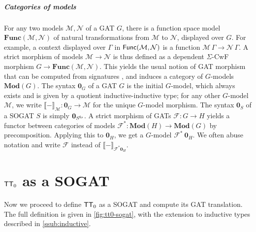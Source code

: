 \documentclass[10pt,a4paper]{article}
\theoremstyle{definition}
\theoremstyle{remark}
\newcommand{\s}[1]{{\ensuremath{\textsf{\upshape #1}}}\xspace}
\newcommand{\cl}[1]{{\ensuremath{\mathcal{#1}}}\xspace}
\newcommand{\re}[1]{{\ensuremath{\mathbf{#1}}}\xspace}
\newcommand{\ZTT}{\ensuremath{\s{TT}_0}\xspace}
\begin{document}
\subparagraph{Categories of models}

For any two models $\cl M, \cl N$ of a GAT $G$, there is a function space model
$\re{Func}(\cl M, \cl N)$ of natural transformations from $\cl M$ to $\cl N$,
displayed over $G$. For example, a context displayed over $\Gamma$ in
$\s{Func}(\cl M, \cl N)$ is a function $\cl M\, \Gamma \to \cl N\, \Gamma$. A
strict morphism of models $\cl M \to \cl N$ is thus defined as a dependent
$\Sigma$-CwF morphism $G \to \re{Func}(\cl M, \cl N)$. This yields the usual
notion of GAT morphism that can be computed from signatures
\cite{Kovacs2023-gq}, and induces a category of $G$-models $\re{Mod}(G)$. The
syntax $\re 0_G$ of a GAT $G$ is the initial $G$-model, which always exists and
is given by a quotient inductive-inductive type; for any other $G$-model $\cl
M$, we write $\llbracket-\rrbracket_{\cl M} : \re 0_G \to \cl M$ for the unique
$G$-model morphism. The syntax $\re 0_S$ of a SOGAT $S$ is simply $\re 0_{S^{\s
fo}}$. A strict morphism\label{rem:morphisms} of GATs $\cl F : G \to H$ yields a
functor between categories of models $\cl F^* : \re{Mod}(H) \to \re{Mod}(G)$ by
precomposition. Applying this to $\re 0_H$, we get a
$G$-model $\cl F^*\ \re 0_H$. We often abuse notation and write $\cl F$ instead of $\llbracket - \rrbracket_{\cl F^* \re 0_H}$.

\section{\ZTT as a SOGAT}\label{sec:itt-sogat}

Now we proceed to define \ZTT as a SOGAT and compute its GAT translation. The
full definition is given in \cref{fig:tt0-sogat}, with the extension to
inductive types described in \cref{ssub:inductive}.
\end{document}
